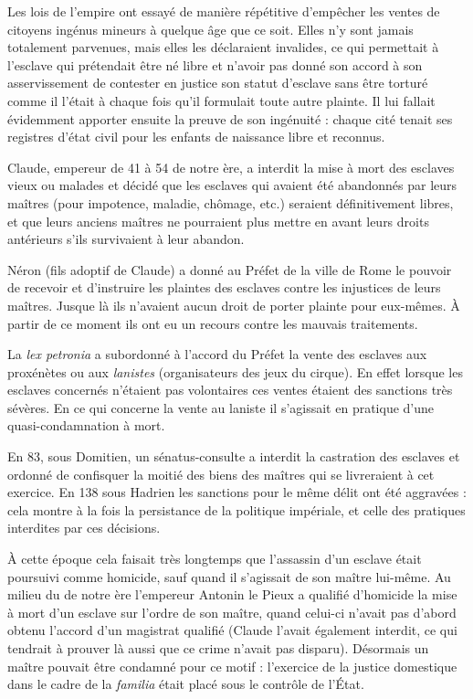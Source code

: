 Les lois de l'empire ont essayé de manière répétitive d'empêcher les ventes de citoyens ingénus mineurs à quelque âge que ce soit. Elles n'y sont jamais totalement parvenues, mais elles les déclaraient invalides, ce qui permettait à l'esclave qui prétendait être né libre et n'avoir pas donné son accord à son asservissement de contester en justice son statut d'esclave sans être torturé comme il l'était à chaque fois qu'il formulait toute autre plainte. Il lui fallait évidemment apporter ensuite la preuve de son ingénuité : chaque cité tenait ses registres d'état civil pour les enfants de naissance libre et reconnus.

 Claude, empereur de 41 à 54 de notre ère, a interdit la mise à mort des esclaves vieux ou malades et décidé que les esclaves qui avaient été abandonnés par leurs maîtres (pour impotence, maladie, chômage, etc.) seraient définitivement libres, et que leurs anciens maîtres ne pourraient plus mettre en avant leurs droits antérieurs s'ils survivaient à leur abandon. 

 Néron (fils adoptif de Claude) a donné au Préfet de la ville de Rome le pouvoir de recevoir et d'instruire les plaintes des esclaves contre les injustices de leurs maîtres. Jusque là ils n'avaient aucun droit de porter plainte pour eux-mêmes. À partir de ce moment ils ont eu un recours contre les mauvais traitements.

 La \emph{lex petronia} a subordonné à l'accord du Préfet la vente des esclaves aux proxénètes ou aux \emph{lanistes} (organisateurs des jeux du cirque). En effet lorsque les esclaves concernés n'étaient pas volontaires ces ventes étaient des sanctions très sévères. En ce qui concerne la vente au laniste il s'agissait en pratique d'une quasi-condamnation à mort.

 En 83, sous Domitien, un sénatus-consulte a interdit la castration des esclaves et ordonné de confisquer la moitié des biens des maîtres qui se livreraient à cet exercice. En 138 sous Hadrien les sanctions pour le même délit ont été aggravées : cela montre à la fois la persistance de la politique impériale, et celle des pratiques interdites par ces décisions. 

 À cette époque cela faisait très longtemps que l'assassin d'un esclave était poursuivi comme homicide, sauf quand il s'agissait de son maître lui-même. Au milieu du  de notre ère l'empereur Antonin le Pieux a qualifié d'homicide la mise à mort d'un esclave sur l'ordre de son maître, quand celui-ci n'avait pas d'abord obtenu l'accord d'un magistrat qualifié (Claude l'avait également interdit, ce qui tendrait à prouver là aussi que ce crime n'avait pas disparu). Désormais un maître pouvait être condamné pour ce motif : l'exercice de la justice domestique dans le cadre de la \emph{familia} était placé sous le contrôle de l'État.

